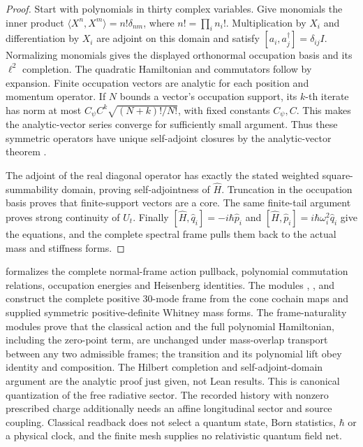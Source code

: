 \begin{proof}
Start with polynomials in thirty complex variables. Give monomials the
inner product \(\langle X^n,X^m\rangle=n!\delta_{nm}\),
where \(n!=\prod_i n_i!\). Multiplication by \(X_i\) and
differentiation by \(X_i\) are adjoint on this domain and satisfy
\([a_i,a_j^\dagger]=\delta_{ij}I\). Normalizing monomials gives the
displayed orthonormal occupation basis and its \(\ell^2\) completion.
The quadratic Hamiltonian and commutators follow by expansion. Finite
occupation vectors are analytic for each position and momentum operator.
If \(N\) bounds a vector's occupation support, its \(k\)-th iterate
has norm at most \(C_\psi C^k\sqrt{(N+k)!/N!}\), with fixed
constants \(C_\psi,C\). This makes the analytic-vector series converge
for sufficiently small argument. Thus these symmetric operators have
unique self-adjoint closures by the analytic-vector theorem
\cite{Nelson1959}.

The adjoint of the real diagonal operator has exactly the stated weighted
square-summability domain, proving self-adjointness of \(\widehat H\).
Truncation in the occupation basis proves that finite-support vectors are
a core. The same finite-tail argument proves strong continuity of
\(U_t\). Finally
\([\widehat H,\widehat q_i]=-i\hbar\widehat p_i\) and
\([\widehat H,\widehat p_i]=i\hbar\omega_i^2\widehat q_i\)
give the equations, and the complete spectral frame pulls them back to
the actual mass and stiffness forms.
\end{proof}

 formalizes the complete
normal-frame action pullback, polynomial commutation relations, occupation
energies and Heisenberg identities. The modules
,
, and
 construct the complete positive
30-mode frame from the cone cochain maps and supplied symmetric
positive-definite Whitney mass forms. The frame-naturality modules prove that
the classical action and the full polynomial Hamiltonian, including the
zero-point term, are unchanged under mass-overlap transport between any two
admissible frames; the transition and its polynomial lift obey identity and
composition. The Hilbert completion and self-adjoint-domain argument are the
analytic proof just given, not Lean results. This is canonical quantization
of the free radiative sector.
The recorded history with nonzero prescribed charge additionally needs an
affine longitudinal sector and source coupling. Classical readback does
not select a quantum state, Born statistics, \(\hbar\) or a physical
clock, and the finite mesh supplies no relativistic quantum field net.

